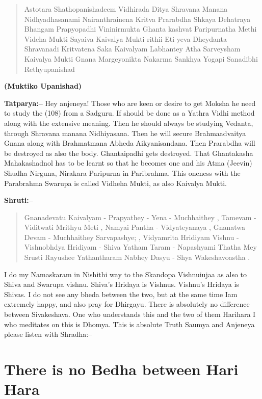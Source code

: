 \begin{verse}
Astotara Shathopanishadeem Vidhirada Ditya Shravana Manana Nidhyadhasanami Nairanthrainena Kritva  Prarabdha Shkaya Dehatraya Bhangam Prapyopadhi Vininirmukta Ghanta kashvat Paripurnatha Methi Videha Mukti Sayaiva Kaivalya Mukti rithii  Eti yeva Dheydanta Shravanadi Kritvatena Saka Kaivalyam Labhantey  Atha Sarveysham Kaivalya Mukti Gnana Margeyonikta Nakarma Sankhya Yogapi Sanadibhi Rethyupanishad 
\end{verse}

\begin{flushright}
\textbf{(Muktiko Upanishad)}
\end{flushright}

\textbf{Tatparya:–} Hey anjeneya! Those who are keen or desire to get Moksha he need to study the (108) from a Sadguru. If should be done as a Yathra Vidhi method along with the extensive meaning. Then he should always be studying Vedanta, through Shravana manana Nidhiyasana. Then he will secure Brahmaadvaitya Gnana along with Brahmatmana Abheda Aikyanisandana. Then Prarabdha will be destroyed as also the body. Ghantaipadhi gets destroyed. That Ghantakasha Mahakashadnol has to be learnt so that he becomes one and his Atma (Jeevin) Shudha Nirguna, Nirakara Paripurna in Paribrahma. This oneness with the Parabrahma Swarupa is called Vidheha Mukti, as also Kaivalya Mukti.

\textbf{Shruti:–}

\begin{verse}
Gnanadevatu Kaivalyam - Prapyathey - Yena - Muchhai\break they , Tamevam - Viditwati Mrithyu Meti , Namyai Pantha - Vidyateyanaya , Gnanatwa Devam - Muchhaithey Sarvapashye; , Vidyamrita Hridiyam Vishnu - Vishnobhdya Hridiyam - Shiva Yatham Taram - Napa\break shyami Thatha Mey Srusti Rayushee  Yathantharam Nabhey Dasyu - Shya Wakeshavoastha .
\end{verse}

I do my Namaskaram in Nishithi way to the Skandopa Vishnuiujaa as also to Shiva and Swarupa vishnu. Shiva's Hridaya is Vishnus. Vishnu's Hridaya is Shivas. I do not see any bheda between the two, but at the same time Iam extremely happy, and also pray for Dhirgayu. There is absolutely no difference between Sivakeshava. One who understands this and the two of them Harihara I who meditates on this is Dhomya. This is absolute Truth Saumya and Anjeneya please listen with Shradha:–

\chapter{There is no Bedha between Hari Hara}

